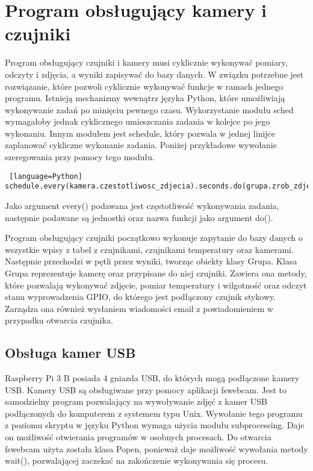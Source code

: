 \documentclass[a4paper,12pt,twoside]{article}
\begin{document}
\section{Program obsługujący kamery i czujniki}
Program obsługujący czujniki i kamery musi cyklicznie wykonywać pomiary, odczyty i zdjęcia, a wyniki zapisywać do bazy danych. W związku potrzebne jest rozwiązanie, które pozwoli cyklicznie wykonywać funkcje w ramach jednego programu. Istnieją mechanizmy wewnątrz języka Python, które umożliwiają wykonywanie zadań po minięciu pewnego czasu. Wykorzystanie modułu sched wymagałoby jednak cyklicznego umieszczania zadania w kolejce po jego wykonaniu. Innym modułem jest schedule, który pozwala w jednej linijce zaplanować cykliczne wykonanie zadania. Poniżej przykładowe wywołanie szeregowania przy pomocy tego modułu.
\begin{lstlisting} [language=Python]
schedule.every(kamera.czestotliwosc_zdjecia).seconds.do(grupa.zrob_zdjecie)
\end{lstlisting}
Jako argument every() podawana jest częstotliwość wykonywania zadania, następnie podawane są jednostki oraz nazwa funkcji jako argument do().

Program obsługujący czujniki początkowo wykonuje zapytanie do bazy danych o wszystkie wpisy z tabel z czujnikami, czujnikami temperatury oraz kamerami. Następnie przechodzi w pętli przez wyniki, tworząc obiekty klasy Grupa. Klasa Grupa reprezentuje kamerę oraz przypisane do niej czujniki. Zawiera ona metody, które pozwalają wykonywać zdjęcie, pomiar temperatury i wilgotność oraz odczyt stanu wyprowadzenia GPIO, do którego jest podłączony czujnik stykowy. Zarządza ona również wysłaniem wiadomości email z powiadomieniem w przypadku otwarcia czujnika.

\subsection{Obsługa kamer USB}
Raspberry Pi 3 B posiada 4 gniazda USB, do których mogą podłączone kamery USB. Kamery USB są obsługiwane przy pomocy aplikacji fswebcam. Jest to samodzielny program pozwalający na wywoływanie zdjęć z kamer USB podłączonych do komputerem z systemem typu Unix. Wywołanie tego programu z poziomu skryptu w języku Python wymaga użycia modułu subprocessing. Daje on możliwość otwierania programów w osobnych procesach. Do otwarcia fswebcam użyta została klasa Popen, ponieważ daje możliwość wywołania metody wait(), pozwalającej zaczekać na zakończenie wykonywania się procesu. 
\end{document}

